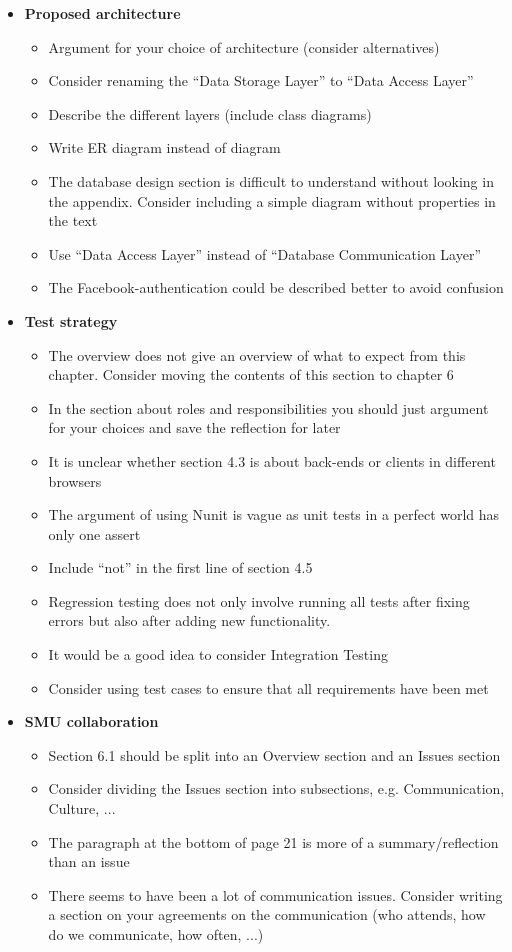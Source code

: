 \documentclass[]{article}
\begin{document}
\begin{itemize}
\item \textbf{Proposed architecture}
	\begin{itemize}
	\item Argument for your choice of architecture (consider alternatives)
	\item Consider renaming the ``Data Storage Layer'' to ``Data Access Layer''
	\item Describe the different layers (include class diagrams)
	\item Write ER diagram instead of diagram
	\item The database design section is difficult to understand without looking in the appendix. Consider including a simple diagram without properties in the text
	\item Use ``Data Access Layer'' instead of ``Database Communication Layer''
	\item The Facebook-authentication could be described better to avoid confusion
	\end{itemize}

\item \textbf{Test strategy}
	\begin{itemize}
	\item The overview does not give an overview of what to expect from this chapter. Consider moving the contents of this section to chapter 6
	\item In the section about roles and responsibilities you should just argument for your choices and save the reflection for later
	\item It is unclear whether section 4.3 is about back-ends or clients in different browsers
	\item The argument of using Nunit is vague as unit tests in a perfect world has only one assert
	\item Include ``not'' in the first line of section 4.5
	\item Regression testing does not only involve running all tests after fixing errors but also after adding new functionality.
	\item It would be a good idea to consider Integration Testing
	\item Consider using test cases to ensure that all requirements have been met
	\end{itemize}

\item \textbf{SMU collaboration}
	\begin{itemize}
	\item Section 6.1 should be split into an Overview section and an Issues section
	\item Consider dividing the Issues section into subsections, e.g. Communication, Culture, ...
	\item The paragraph at the bottom of page 21 is more of a summary/reflection than an issue
	\item There seems to have been a lot of communication issues. Consider writing a section on your agreements on the communication (who attends, how do we communicate, how often, ...)
	\end{itemize}
\end{itemize}
\end{document}
